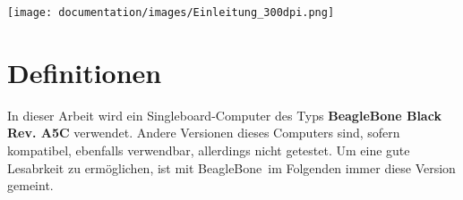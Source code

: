 \vfill

\texttt{[image: documentation/images/Einleitung\_300dpi.png]}

\vfill

\section{Definitionen}
In dieser Arbeit wird ein Singleboard-Computer des Typs \textbf{BeagleBone Black Rev. A5C} verwendet. Andere Versionen dieses Computers sind, sofern kompatibel, ebenfalls verwendbar, allerdings nicht getestet. Um eine gute Lesabrkeit zu ermöglichen, ist mit \glqq BeagleBone\grqq ~im Folgenden immer diese Version gemeint.